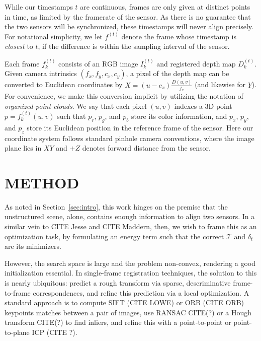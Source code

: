 \documentclass[letterpaper, 10 pt, conference]{ieeeconf}  %
\begin{document}
While our timestamps $t$ are continuous, frames are only given at distinct points in time, as limited by the framerate of the sensor. 
As there is no guarantee that the two sensors will be synchronized, these timestamps will never align precisely. 
For notational simplicity, we let $f^{(t)}$ denote the frame whose timestamp is \emph{closest} to $t$, if the difference is within the sampling interval of the sensor.

Each frame $f_k^{(t)}$ consists of an RGB image $I_k^{(t)}$ and registered depth map $D_k^{(t)}$. Given camera intrinsics 
$(f_x,f_y,c_x,c_y)$, a pixel of the depth map can be converted to Euclidean coordinates by $X = (u-c_x)\frac{D(u,v)}{f_x}$ (and likewise for $Y$). 
For convenience, we make this conversion implicit by utilizing the notation of \emph{organized point clouds}.
We say that each pixel $(u,v)$ indexes a 3D point $p = f_k^{(t)}(u,v)$ such that $p_r$, $p_g$, and $p_b$ store its color information, and $p_x$, $p_y$, and $p_z$ store its Euclidean 
position in the reference frame of the sensor. Here our coordinate system follows standard
pinhole camera conventions, where the image plane lies in $XY$ and $+Z$ denotes forward distance from the sensor.

\section{METHOD}

As noted in Section~\ref{sec:intro}, this work hinges on the premise that the unstructured scene, alone, contains enough information to align two sensors. 
In a similar vein to CITE Jesse and CITE Maddern, then, we wish to frame this as an optimization task, by formulating an energy term such that the correct $\mathcal{T}$ 
and $\delta_t$ are its minimizers.  

However, the search space is large and the problem non-convex, rendering a good initialization essential. In single-frame registration techniques, the solution to this is nearly ubiquitous: predict a rough transform via 
sparse, descriminative frame-to-frame correspondences, and refine this prediction via a local optimization. A standard approach is to compute SIFT (CITE LOWE) or ORB (CITE ORB) keypoints matches between a 
pair of images, use RANSAC CITE(?) or a Hough transform CITE(?) to find inliers, and refine this with a point-to-point or point-to-plane ICP (CITE ?).
\end{document}
